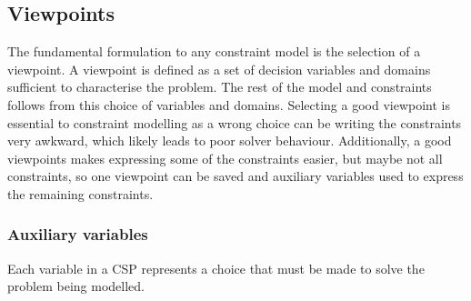 \documentclass[CS4402-Notes.tex]{subfiles}
\begin{document}
\subsection{Viewpoints}
The fundamental formulation to any constraint model is the selection of a viewpoint. A viewpoint is defined as a set of decision variables and domains sufficient to characterise the problem. The rest of the model and constraints follows from this choice of variables and domains.
\n
Selecting a good viewpoint is essential to constraint modelling as a wrong choice can be writing the constraints very awkward, which likely leads to poor solver behaviour. Additionally, a good viewpoints makes expressing some of the constraints easier, but maybe not all constraints, so one viewpoint can be saved and auxiliary variables used to express the remaining constraints.

\subsubsection{Auxiliary variables}
Each variable in a CSP represents a choice that must be made to solve the problem being modelled. 
\end{document}
